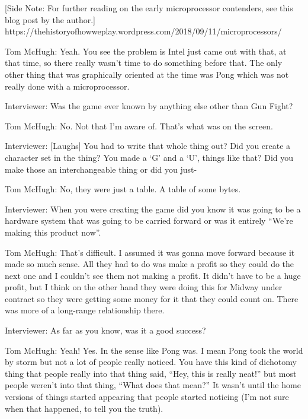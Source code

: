 [Side Note: For further reading on the early microprocessor contenders, see this blog post by the author.] https://thehistoryofhowweplay.wordpress.com/2018/09/11/microprocessors/ 

\textcolor{interviewee}{Tom McHugh:} Yeah. You see the problem is Intel just came out with that, at that time, so there really wasn’t time to do something before that. The only other thing that was graphically oriented at the time was Pong which was not really done with a microprocessor.

\textcolor{interviewer}{Interviewer:} Was the game ever known by anything else other than Gun Fight?

\textcolor{interviewee}{Tom McHugh:} No. Not that I’m aware of. That’s what was on the screen.

\textcolor{interviewer}{Interviewer:} [Laughs] You had to write that whole thing out? Did you create a character set in the thing? You made a ‘G’ and a ‘U’, things like that? Did you make those an interchangeable thing or did you just-

\textcolor{interviewee}{Tom McHugh:} No, they were just a table. A table of some bytes.

\textcolor{interviewer}{Interviewer:} When you were creating the game did you know it was going to be a hardware system that was going to be carried forward or was it entirely “We’re making this product now”.

\textcolor{interviewee}{Tom McHugh:} That’s difficult. I assumed it was gonna move forward because it made so much sense. All they had to do was make a profit so they could do the next one and I couldn’t see them not making a profit. It didn’t have to be a huge profit, but I think on the other hand they were doing this for Midway under contract so they were getting some money for it that they could count on. There was more of a long-range relationship there.

\textcolor{interviewer}{Interviewer:} As far as you know, was it a good success?

\textcolor{interviewee}{Tom McHugh:} Yeah! Yes. In the sense like Pong was. I mean Pong took the world by storm but not a lot of people really noticed. You have this kind of dichotomy thing that people really into that thing said, “Hey, this is really neat!” but most people weren’t into that thing, “What does that mean?” It wasn’t until the home versions of things started appearing that people started noticing (I’m not sure when that happened, to tell you the truth).

